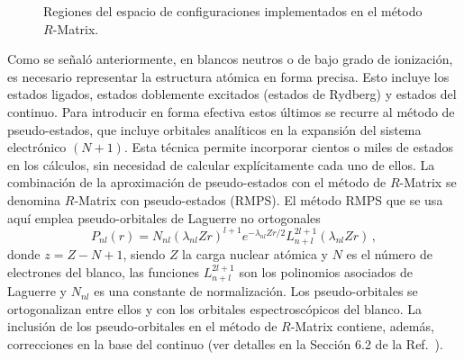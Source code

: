 \begin{figure}
\centering
{}
\vspace{0.5cm}
\caption{Regiones del espacio de configuraciones implementados en el 
método $R$-Matrix.}
\label{fig:rmatrix-regions}
\end{figure}

Como se señaló anteriormente, en blancos neutros o de bajo grado de 
ionización, es necesario representar la estructura atómica en forma 
precisa. Esto incluye los estados ligados, estados doblemente excitados 
(estados de Rydberg) y estados del continuo. Para introducir en forma 
efectiva estos últimos se recurre al método de pseudo-estados, que 
incluye orbitales analíticos en la expansión del sistema electrónico 
\mbox{$(N+1)$}. Esta técnica permite incorporar cientos o miles de 
estados en los cálculos, sin necesidad de calcular explícitamente cada 
uno de ellos. La combinación de la aproximación de pseudo-estados con el 
método de $R$-Matrix se denomina $R$-Matrix con pseudo-estados (RMPS). 
El método RMPS que se usa aquí emplea pseudo-orbitales de Laguerre no 
ortogonales 
\begin{equation}
P_{nl}(r) = N_{nl}(\lambda_{nl}Zr)^{l+1} e^{-\lambda_{nl}Zr/2} 
L_{n+l}^{2l+1}(\lambda_{nl}Zr)\,,
\label{eq:pseudo}
\end{equation}
donde $z=Z-N+1$, siendo $Z$ la carga nuclear atómica y $N$ es el número 
de electrones del blanco, las funciones $L_{n+l}^{2l+1}$ son los 
polinomios asociados de Laguerre y $N_{nl}$ es una constante de 
normalización. Los pseudo-orbitales se ortogonalizan entre ellos
y con los orbitales espectroscópicos del blanco. La inclusión de los 
pseudo-orbitales en el método de $R$-Matrix contiene, además, 
correcciones en la base del continuo (ver detalles en la Sección 6.2 de 
la Ref.~\cite{Burke:11}).

